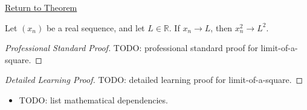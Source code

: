 \newpage
{}
\label{prf:limit-of-a-square}

\begin{remark*}[Return]
\hyperref[thm:limit-of-a-square]{Return to Theorem}
\end{remark*}

\begin{theorem*}
Let $(x_n)$ be a real sequence, and let $L\in\mathbb{R}$. If $x_n\to L$,
then $x_n^2\to L^2$.

\smallskip
\noindent
\end{theorem*}

\begin{proof}[Professional Standard Proof]
\LRAProofBodyStart
TODO: professional standard proof for limit-of-a-square.
\end{proof}

\begin{proof}[Detailed Learning Proof]
\LRAProofBodyStart
TODO: detailed learning proof for limit-of-a-square.
\end{proof}

\begin{remark*}
\end{remark*}

\begin{dependencies}
\begin{itemize}
  \item TODO: list mathematical dependencies.
\end{itemize}
\end{dependencies}

\clearpage
